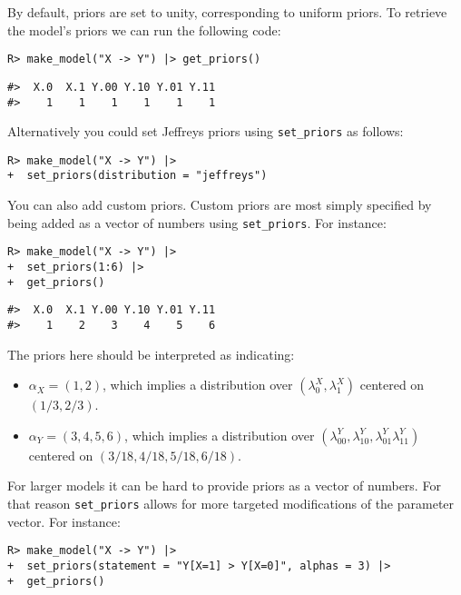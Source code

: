 \documentclass[
  11pt,
  article]{jss}
\providecommand{\tightlist}{%
  \setlength{\itemsep}{0pt}\setlength{\parskip}{0pt}}\usepackage{longtable,booktabs,array}
\begin{document}
By default, priors are set to unity, corresponding to uniform priors. To
retrieve the model's priors we can run the following code:

\begin{verbatim}
R> make_model("X -> Y") |> get_priors()
\end{verbatim}

\begin{verbatim}
#>  X.0  X.1 Y.00 Y.10 Y.01 Y.11 
#>    1    1    1    1    1    1
\end{verbatim}

Alternatively you could set Jeffreys priors using \texttt{set\_priors}
as follows:

\begin{verbatim}
R> make_model("X -> Y") |> 
+  set_priors(distribution = "jeffreys") 
\end{verbatim}

You can also add custom priors. Custom priors are most simply specified
by being added as a vector of numbers using \texttt{set\_priors}. For
instance:

\begin{verbatim}
R> make_model("X -> Y") |> 
+  set_priors(1:6) |> 
+  get_priors()
\end{verbatim}

\begin{verbatim}
#>  X.0  X.1 Y.00 Y.10 Y.01 Y.11 
#>    1    2    3    4    5    6
\end{verbatim}

The priors here should be interpreted as indicating:

\begin{itemize}
\tightlist
\item
  \(\alpha_X = (1,2)\), which implies a distribution over
  \((\lambda^X_0, \lambda^X_1)\) centered on \((1/3, 2/3)\).
\item
  \(\alpha_Y = (3,4,5,6)\), which implies a distribution over
  \((\lambda^Y_{00}, \lambda^Y_{10}, \lambda^Y_{01} \lambda^Y_{11})\)
  centered on \((3/18, 4/18, 5/18, 6/18)\).
\end{itemize}

For larger models it can be hard to provide priors as a vector of
numbers. For that reason \texttt{set\_priors} allows for more targeted
modifications of the parameter vector. For instance:

\begin{verbatim}
R> make_model("X -> Y") |>
+  set_priors(statement = "Y[X=1] > Y[X=0]", alphas = 3) |>
+  get_priors()
\end{verbatim}
\end{document}
